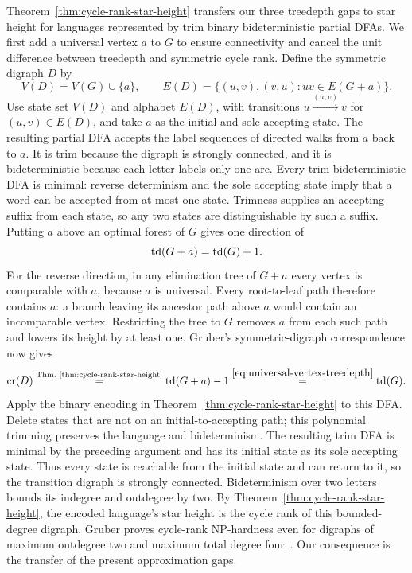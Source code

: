 Theorem~\ref{thm:cycle-rank-star-height} transfers our three
treedepth gaps to star height for languages represented by trim binary
bideterministic partial DFAs. We first add a universal vertex $a$
to $G$ to ensure connectivity and cancel the unit difference between
treedepth and symmetric cycle rank. Define the symmetric digraph $D$ by
\[
 V(D)=V(G)\cup\{a\},\qquad
 E(D)=\{(u,v),(v,u):uv\in E(G+a)\}.
\]
Use state set $V(D)$ and alphabet $E(D)$, with transitions
$u\xrightarrow{(u,v)}v$ for $(u,v)\in E(D)$, and take $a$ as
the initial and sole accepting state. The resulting partial DFA accepts the label sequences
of directed walks from $a$ back to $a$. It is trim because the digraph
is strongly connected, and it is bideterministic because each letter
labels only one arc. Every trim bideterministic DFA is minimal:
reverse determinism and the sole accepting state imply that a word
can be accepted from at most one state. Trimness supplies an
accepting suffix from each state, so any two states are
distinguishable by such a suffix.
Putting $a$ above an optimal forest of $G$ gives one direction of
\begin{equation}\label{eq:universal-vertex-treedepth}
 \operatorname{td}(G+a)=\operatorname{td}(G)+1.
\end{equation}
For the reverse direction, in any elimination tree of $G+a$ every
vertex is comparable with $a$, because $a$ is universal. Every
root-to-leaf path therefore contains $a$: a branch leaving its ancestor
path above $a$ would contain an incomparable vertex. Restricting the
tree to $G$ removes $a$ from each such path and lowers its height
by at least one. Gruber's symmetric-digraph correspondence now gives
\[
 \operatorname{cr}(D)
 \overset{\text{Thm.~\ref{thm:cycle-rank-star-height}}}{=}
 \operatorname{td}(G+a)-1
 \overset{\eqref{eq:universal-vertex-treedepth}}{=}\operatorname{td}(G).
\]
Apply the binary encoding in Theorem~\ref{thm:cycle-rank-star-height}
to this DFA.
Delete states that are not on an initial-to-accepting path; this
polynomial trimming preserves the language and bideterminism. The
resulting trim DFA is minimal by the preceding argument and has its
initial state as its sole accepting state.
Thus every state is reachable from the initial state and can return
to it, so the transition digraph is strongly connected. Bideterminism over two
letters bounds its indegree and outdegree by two. By
Theorem~\ref{thm:cycle-rank-star-height}, the encoded language's star
height is the cycle rank of this bounded-degree digraph.
Gruber proves cycle-rank NP-hardness
even for digraphs of maximum outdegree two and maximum total degree
four~\cite[Corollary 24]{Gruber2008}. Our consequence is the transfer
of the present approximation gaps.


